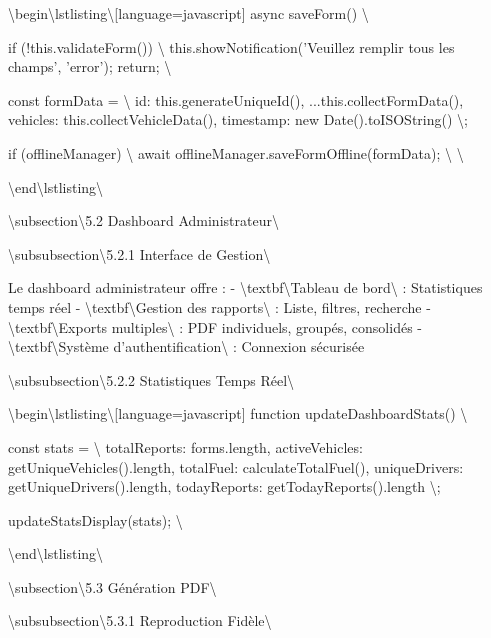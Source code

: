 \documentclass[12pt,a4paper]{report}
\begin{document}
\textbackslash{}begin\textbackslash{}{lstlisting\textbackslash{}}[language=javascript]
async saveForm() \textbackslash{}{
    if (!this.validateForm()) \textbackslash{}{
        this.showNotification('Veuillez remplir tous les champs', 'error');
        return;
    \textbackslash{}}
    
    const formData = \textbackslash{}{
        id: this.generateUniqueId(),
        ...this.collectFormData(),
        vehicles: this.collectVehicleData(),
        timestamp: new Date().toISOString()
    \textbackslash{}};
    
    if (offlineManager) \textbackslash{}{
        await offlineManager.saveFormOffline(formData);
    \textbackslash{}}
\textbackslash{}}
\textbackslash{}end\textbackslash{}{lstlisting\textbackslash{}}

\textbackslash{}subsection\textbackslash{}{5.2 Dashboard Administrateur\textbackslash{}}

\textbackslash{}subsubsection\textbackslash{}{5.2.1 Interface de Gestion\textbackslash{}}

Le dashboard administrateur offre :
- \textbackslash{}textbf\textbackslash{}{Tableau de bord\textbackslash{}} : Statistiques temps réel
- \textbackslash{}textbf\textbackslash{}{Gestion des rapports\textbackslash{}} : Liste, filtres, recherche
- \textbackslash{}textbf\textbackslash{}{Exports multiples\textbackslash{}} : PDF individuels, groupés, consolidés
- \textbackslash{}textbf\textbackslash{}{Système d'authentification\textbackslash{}} : Connexion sécurisée

\textbackslash{}subsubsection\textbackslash{}{5.2.2 Statistiques Temps Réel\textbackslash{}}

\textbackslash{}begin\textbackslash{}{lstlisting\textbackslash{}}[language=javascript]
function updateDashboardStats() \textbackslash{}{
    const stats = \textbackslash{}{
        totalReports: forms.length,
        activeVehicles: getUniqueVehicles().length,
        totalFuel: calculateTotalFuel(),
        uniqueDrivers: getUniqueDrivers().length,
        todayReports: getTodayReports().length
    \textbackslash{}};
    
    updateStatsDisplay(stats);
\textbackslash{}}
\textbackslash{}end\textbackslash{}{lstlisting\textbackslash{}}

\textbackslash{}subsection\textbackslash{}{5.3 Génération PDF\textbackslash{}}

\textbackslash{}subsubsection\textbackslash{}{5.3.1 Reproduction Fidèle\textbackslash{}}
\end{document}
